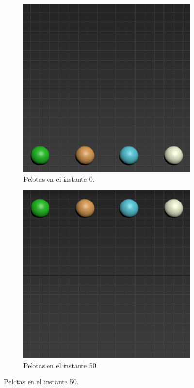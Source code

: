 \documentclass{article}
\begin{document}
\begin{figure}[H]
    \centering
    \begin{subfigure}[H]{0.48\textwidth}
        \centering
        \includegraphics[width=\textwidth]{imagenes/Ejercicio 1/keyframes/0.png}
        \caption{Pelotas en el instante 0.}
    \end{subfigure}
    \hfill
    \begin{subfigure}[H]{0.48\textwidth}
        \centering
        \includegraphics[width=\textwidth]{imagenes/Ejercicio 1/keyframes/50.png}
        \caption{Pelotas en el instante 50.}
    \end{subfigure}
\end{figure}
\end{document}
